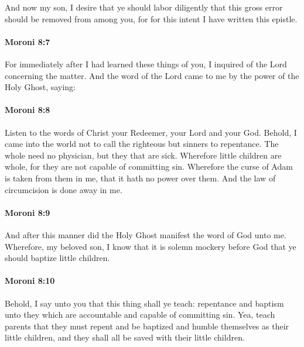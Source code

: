 			And now my son, I desire that ye should labor diligently
			that this gross error should be removed from among you,
			for for this intent I have written this epistle.

		\paragraph{Moroni 8:7} %
			\label{MORONI-8-7}

			For immediately after I had learned these things of you,
			I inquired of the Lord concerning the matter.
			And the word of the Lord came to me by the power of the Holy Ghost, saying:

		\paragraph{Moroni 8:8} %
			\label{MORONI-8-8}

			Listen to the words of Christ your Redeemer, your Lord and your God.
			Behold, I came into the world not to call the righteous but sinners to repentance.
			The whole need no physician, but they that are sick.
			Wherefore little children are whole,
			for they are not capable of committing sin.
			Wherefore the curse of Adam is taken from them in me,
			that it hath no power over them.
			And the law of circumcision is done away in me.

		\paragraph{Moroni 8:9} %
			\label{MORONI-8-9}

			And after this manner did the Holy Ghost manifest the word of God unto me.
			Wherefore, my beloved son,
			I know that it is solemn mockery before God
			that ye should baptize little children.

		\paragraph{Moroni 8:10} %
			\label{MORONI-8-10}

			Behold, I say unto you that this thing shall ye teach:
			repentance and baptism unto they
			which are accountable and capable of committing sin.
			Yea, teach parents that they must repent and be baptized
			and humble themselves as their little children,
			and they shall all be saved with their little children.

